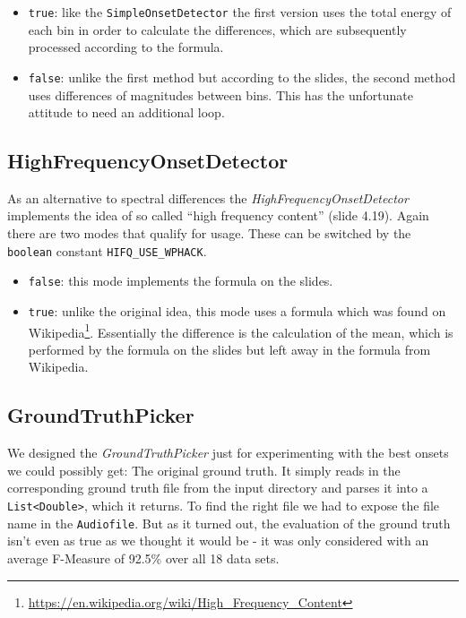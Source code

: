 \begin{itemize}
  \item \texttt{true}: like the \texttt{SimpleOnsetDetector} the first version
  uses the total energy of each bin in order to calculate the differences, which
  are subsequently processed according to the formula.
  \item \texttt{false}: unlike the first method but according to the slides, the
  second method uses differences of magnitudes between bins. This has the
  unfortunate attitude to need an additional loop.
\end{itemize}

\subsection{\ttfamily HighFrequencyOnsetDetector} \label{ssec:onsethighfreq}
As an alternative to spectral differences the \emph{HighFrequencyOnsetDetector}
implements the idea of so called ``high frequency content'' (slide 4.19). Again
there are two modes that qualify for usage. These can be switched by the
\texttt{boolean} constant \texttt{HIFQ\_USE\_WPHACK}.

\begin{itemize}
  \item \texttt{false}: this mode implements the formula on the slides.
  \item \texttt{true}: unlike the original idea, this mode uses a formula which
  was found on
  Wikipedia\footnote{\url{https://en.wikipedia.org/wiki/High_Frequency_Content}}.
  Essentially the difference is the calculation of the mean, which is performed
  by the formula on the slides but left away in the formula from Wikipedia.
\end{itemize}

\subsection{\ttfamily GroundTruthPicker} \label{ssec:onsetgroundtruth}
We designed the \emph{GroundTruthPicker} just for experimenting with the best
onsets we could possibly get: The original ground truth. It simply reads in the
corresponding ground truth file from the input directory and parses it into a
\texttt{List<Double>}, which it returns. To find the right file we had to expose
the file name in the \texttt{Audiofile}. But as it turned out, the evaluation of
the ground truth isn't even as true as we thought it would be - it was only
considered with an average F-Measure of 92.5\% over all 18 data sets.

